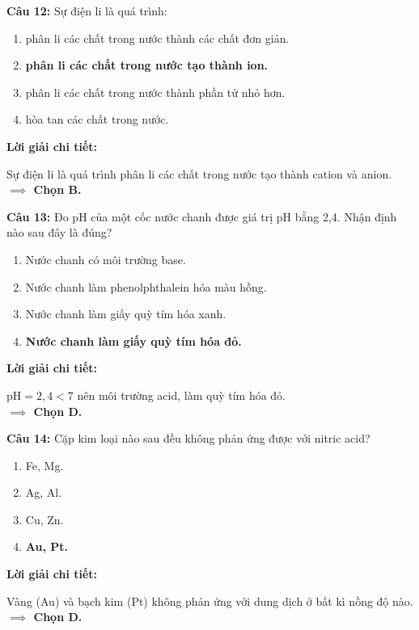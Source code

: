 \documentclass[10.5pt,a4paper]{article}
\newcommand{\loigiai}[1]{%
  \vspace{1pt}
  \begin{tcolorbox}
  {\color{myBlue}\bfseries Lời giải chi tiết:}\par\vspace{1pt}
  {\small #1}
  \end{tcolorbox}
  \vspace{2pt}
}
\begin{document}
\textbf{Câu 12:} Sự điện li là quá trình:
\begin{enumerate}[label=\textbf{\Alph*.}, itemsep=1pt, topsep=1pt, leftmargin=1.5cm]
    \item phân li các chất trong nước thành các chất đơn giản.
    \item \textbf{\color{myRed}phân li các chất trong nước tạo thành ion.}
    \item phân li các chất trong nước thành phần tử nhỏ hơn.
    \item hòa tan các chất trong nước.
\end{enumerate}
\loigiai{Sự điện li là quá trình phân li các chất trong nước tạo thành cation và anion.\\ \textbf{$\implies$ Chọn B.}}

\textbf{Câu 13:} Đo pH của một cốc nước chanh được giá trị pH bằng 2,4. Nhận định nào sau đây là đúng?
\begin{enumerate}[label=\textbf{\Alph*.}, itemsep=1pt, topsep=1pt, leftmargin=1.5cm]
    \item Nước chanh có môi trường base. \hfill \item Nước chanh làm phenolphthalein hóa màu hồng.
    \item Nước chanh làm giấy quỳ tím hóa xanh. \hfill \item \textbf{\color{myRed}Nước chanh làm giấy quỳ tím hóa đỏ.}
\end{enumerate}
\loigiai{$\text{pH} = 2,4 < 7$ nên môi trường acid, làm quỳ tím hóa đỏ.\\ \textbf{$\implies$ Chọn D.}}

\textbf{Câu 14:} Cặp kim loại nào sau đều không phản ứng được với nitric acid?
\begin{enumerate}[label=\textbf{\Alph*.}, itemsep=1pt, topsep=1pt, leftmargin=1.5cm]
    \item Fe, Mg. \hfill \item Ag, Al. \hfill \item Cu, Zn. \hfill \item \textbf{\color{myRed}Au, Pt.}
\end{enumerate}
\loigiai{Vàng (Au) và bạch kim (Pt) không phản ứng với dung dịch \ce{HNO3} ở bất kì nồng độ nào.\\ \textbf{$\implies$ Chọn D.}}
\end{document}
